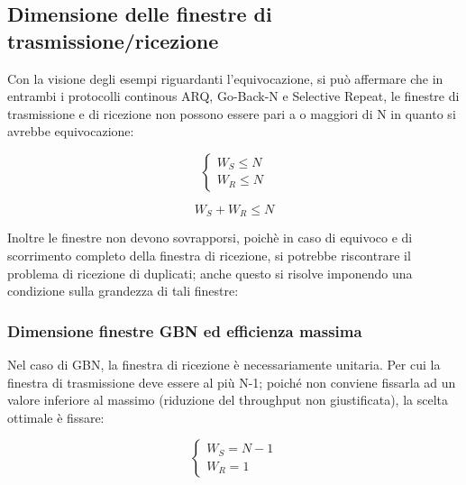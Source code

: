 \newpage

\subsection{Dimensione delle finestre di trasmissione/ricezione}
Con la visione degli esempi riguardanti l'equivocazione, si può affermare che in entrambi i protocolli continous ARQ, Go-Back-N e Selective Repeat, le finestre di trasmissione e di ricezione non possono essere pari a o maggiori di N in quanto si avrebbe equivocazione:

\begin{center}
\begin{minipage}{0.45\textwidth}
    \begin{equation*}
        \begin{cases}
            W_S \leq N \\
            W_R \leq N
        \end{cases}
    \end{equation*}
\end{minipage}
\hfill
\begin{minipage}{0.45\textwidth}
    \begin{equation*}
        W_S + W_R \leq N
    \end{equation*}
\end{minipage}
\end{center}
Inoltre le finestre non devono sovrapporsi, poichè in caso di equivoco e di scorrimento completo della finestra di ricezione, si potrebbe riscontrare il problema di ricezione di duplicati; anche questo si risolve imponendo una condizione sulla grandezza di tali finestre:

\subsubsection{Dimensione finestre GBN ed efficienza massima}

\begin{minipage}{0.55\textwidth}
Nel caso di GBN, la finestra di ricezione è necessariamente
unitaria. Per cui la finestra di trasmissione deve essere al più
N-1; poiché non conviene fissarla ad un valore inferiore al
massimo (riduzione del throughput non giustificata), la scelta
ottimale è fissare: 
\end{minipage}%
\hfill
\begin{minipage}{0.4\textwidth}
\begin{equation*}
    \begin{cases}
        W_S = N-1 \\
        W_R = 1
    \end{cases}
\end{equation*}
\end{minipage}

